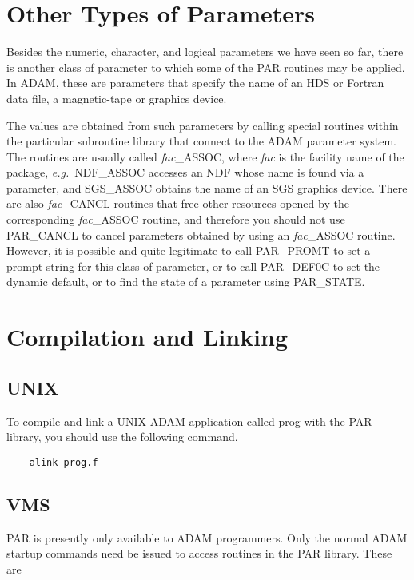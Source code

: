 \documentclass[twoside,11pt]{article}
\newcommand{\xlabel}[1]{}
\begin{document}
\section{\xlabel{other_types_of_parameters}Other Types of Parameters}

Besides the numeric, character, and logical parameters we have seen so
far, there is another class of parameter to which some of the PAR
routines may be applied.  In {\footnotesize ADAM}, these are parameters
that specify the name of an HDS or Fortran data file, a magnetic-tape or
graphics device.

The values are obtained from such parameters by calling special routines
within the particular subroutine library that connect to the
{\footnotesize ADAM} parameter system.  The routines are usually called
{\it fac}\_ASSOC, where {\it fac\/} is the facility name of the package,
{\it e.g.}\ NDF\_ASSOC accesses an NDF whose name is found via a
parameter, and SGS\_ASSOC obtains the name of an SGS graphics device.
There are also {\it fac}\_CANCL routines that free other resources
opened by the corresponding {\it fac}\_ASSOC routine, and therefore you
should not use PAR\_CANCL to cancel parameters obtained by using an {\it
fac}\_ASSOC routine. However, it is possible and quite legitimate to
call PAR\_PROMT to set a prompt string for this class of parameter, or
to call PAR\_DEF0C to set the dynamic default, or to find the state of a
parameter using PAR\_STATE. 

\section{\xlabel{compilation_and_linking}Compilation and Linking}

\subsection{\xlabel{unix}UNIX}

To compile and link a UNIX {\footnotesize ADAM} application called prog
with the PAR library, you should use the following command. 

\begin{verbatim}
    alink prog.f
\end{verbatim}

\subsection{\xlabel{vms}VMS}

PAR is presently only available to {\footnotesize ADAM} programmers. 
Only the normal ADAM startup commands need be issued to access routines
in the PAR library.  These are
\end{document}

